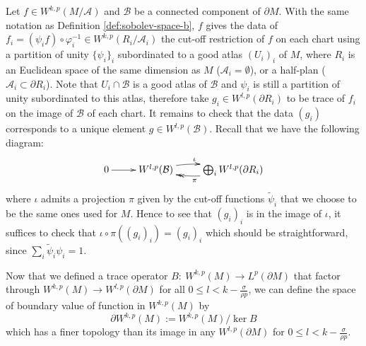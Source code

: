 Let \(f\in W^{k,p}(M/\mathcal{A})\) and \(\mathcal{B}\) be a
connected component of \(\partial M\). With the same notation as Definition
\ref{def:sobolev-space-b}, \(f\) gives the data of \(f_i = (\psi_i f)\circ
   \varphi_i^{-1}\in W^{k,p}(R_i/\mathcal{A}_i)\) the cut-off restriction of \(f\) on
each chart using a partition of unity \(\{\psi_i\}_i\) subordinated to a good atlas \((U_i)_i\) of \(M\), where \(R_i\) is an Euclidean space of the same
dimension as \(M\) (\(\mathcal{A}_i = \emptyset\)), or a half-plan (\(\mathcal{A}_i\subset \partial R_i\)). Note that \(U_i\cap \mathcal{B}\) is a good atlas
of \(\mathcal{B}\) and \(\psi_i\) is still a partition of unity subordinated to this
atlas, therefore take \(g_i\in W^{l,p}(\partial R_i)\) to be
trace of \(f_i\) on the image of \(\mathcal{B}\) of each chart. It remains to check
that the data \((g_i)\) corresponds to a unique element \(g\in W^{l,p}(\mathcal{B})\). Recall that we have the following diagram:
\[
\xymatrix{
0 \ar@{->}[r] & W^{l,p}(\mathcal{B}) \ar@/^/@{->}[r]^{\iota} & \bigoplus_i W^{l,p}(\partial R_i) \ar@/^/@{->>}[l]^{\pi}
}
\]
where \(\iota\) admits a projection \(\pi\) given by the cut-off functions \(\tilde
\psi_i\) that we choose to be the same ones used for \(M\). Hence to see that \((g_i)_i\) is in the image of \(\iota\), it suffices to
check that \(\iota\circ\pi((g_i)_i) = (g_i)_i\) which should be straightforward, since
\(\sum_i \tilde \psi_i \psi_i = 1\).

Now that we defined a trace operator \(B:\ W^{k,p}(M) \longrightarrow L^p( \partial M)\)
that factor through \(W^{k,p}(M) \longrightarrow W^{l,p}(\partial M)\) for all \(0\leq l < k -
\frac{\sigma}{\rho p}\), we can define the space of boundary value of function in
\(W^{k,p}(M)\) by 
\[
\partial W^{k,p}(M):= W^{k,p}(M) / \ker B
\]
which has a finer topology than its image in any \(W^{l,p}(\partial M)\) for \(0\leq
l< k- \frac{\sigma}{\rho p}\).
